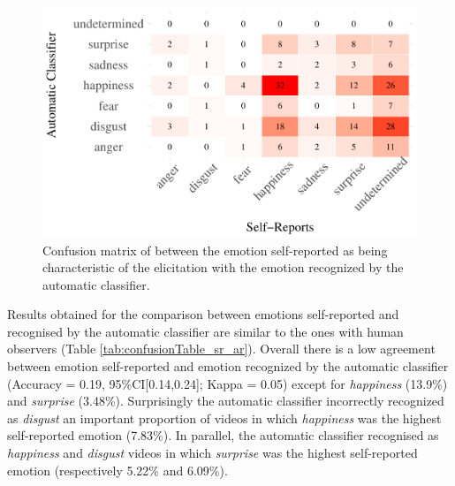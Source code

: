 \documentclass[conference,final,]{IEEEtran}
\makeatletter
\def\maxwidth{\ifdim\Gin@nat@width>\linewidth\linewidth
\else\Gin@nat@width\fi}
\let\Oldincludegraphics\includegraphics
\renewcommand{\includegraphics}[1]{\Oldincludegraphics[width=\maxwidth]{#1}}
\makeatother
\begin{document}
\begin{figure}
\centering
\includegraphics{ACII_2019_paper_files/figure-latex/confusionMatrix_sr_ar-1.pdf}
\caption{Confusion matrix of between the emotion self-reported as being
characteristic of the elicitation with the emotion recognized by the
automatic classifier.}
\end{figure}

Results obtained for the comparison between emotions self-reported and
recognised by the automatic classifier are similar to the ones with
human observers (Table \ref{tab:confusionTable_sr_ar}). Overall there is
a low agreement between emotion self-reported and emotion recognized by
the automatic classifier (Accuracy = 0.19, 95\%CI{[}0.14,0.24{]}; Kappa
= 0.05) except for \emph{happiness} (13.9\%) and \emph{surprise}
(3.48\%). Surprisingly the automatic classifier incorrectly recognized
as \emph{disgust} an important proportion of videos in which
\emph{happiness} was the highest self-reported emotion (7.83\%). In
parallel, the automatic classifier recognised as \emph{happiness} and
\emph{disgust} videos in which \emph{surprise} was the highest
self-reported emotion (respectively 5.22\% and 6.09\%).
\end{document}
